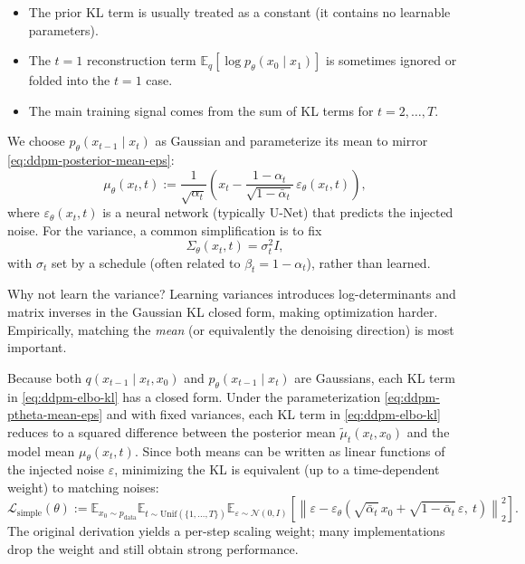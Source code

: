 \documentclass[../main]{subfiles}
\begin{document}
\begin{remark}
\begin{itemize}
    \item The prior KL term is usually treated as a constant (it contains no learnable parameters).
    \item The $t=1$ reconstruction term $\mathbb E_q[\log p_\theta(x_0\mid x_1)]$ is sometimes ignored or folded into the $t=1$ case.
    \item The main training signal comes from the sum of KL terms for $t=2,\dots,T$.
\end{itemize}
\end{remark}

We choose $p_\theta(x_{t-1}\mid x_t)$ as Gaussian and parameterize its mean to mirror \eqref{eq:ddpm-posterior-mean-eps}:
\begin{equation}\label{eq:ddpm-ptheta-mean-eps}
    \mu_\theta(x_t,t)
    :=
    \frac{1}{\sqrt{\alpha_t}}
    \left(
        x_t - \frac{1-\alpha_t}{\sqrt{1-\bar\alpha_t}}\,\varepsilon_\theta(x_t,t)
    \right),
\end{equation}
where $\varepsilon_\theta(x_t,t)$ is a neural network (typically U-Net) that predicts the injected noise.
For the variance, a common simplification is to fix
\begin{equation}
    \Sigma_\theta(x_t,t) = \sigma_t^2 I,
\end{equation}
with $\sigma_t$ set by a schedule (often related to $\beta_t=1-\alpha_t$), rather than learned.

\begin{remark}
    Why not learn the variance? Learning variances introduces log-determinants and matrix inverses in the Gaussian KL closed form, making optimization harder.
Empirically, matching the \emph{mean} (or equivalently the denoising direction) is most important.
\end{remark}

Because both $q(x_{t-1}\mid x_t,x_0)$ and $p_\theta(x_{t-1}\mid x_t)$ are Gaussians, each KL term in \eqref{eq:ddpm-elbo-kl} has a closed form.
Under the parameterization \eqref{eq:ddpm-ptheta-mean-eps} and with fixed variances,
each KL term in \eqref{eq:ddpm-elbo-kl} reduces to a squared difference between
the posterior mean $\tilde\mu_t(x_t,x_0)$ and the model mean $\mu_\theta(x_t,t)$.
Since both means can be written as linear functions of the injected noise $\varepsilon$,
minimizing the KL is equivalent (up to a time-dependent weight) to matching noises:
\begin{equation}\label{eq:ddpm-simple-loss}
    \mathcal L_{\mathrm{simple}}(\theta)
    :=
    \mathbb E_{x_0\sim p_{\mathrm{data}}}
    \mathbb E_{t\sim\mathrm{Unif}(\{1,\dots,T\})}
    \mathbb E_{\varepsilon\sim\mathcal N(0,I)}
    \left[
        \left\|
            \varepsilon
            - \varepsilon_\theta\!\left(
                \sqrt{\bar\alpha_t}\,x_0 + \sqrt{1-\bar\alpha_t}\,\varepsilon,\ t
            \right)
        \right\|_2^2
    \right].
\end{equation}
The original derivation yields a per-step scaling weight; many implementations drop the weight and still obtain strong performance.
\end{document}
